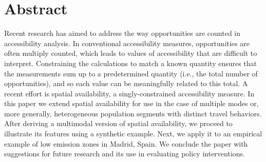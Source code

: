 \documentclass[10pt,letterpaper]{article}
\newcommand{\getIndex}[2]{
  \ForEach{,}{\IfEq{#1}{\thislevelitem}{\number\thislevelcount\ExitForEach}{}}{#2}
}
\newcommand{\getAff}[1]{
  \getIndex{#1}{McMaster,Madrid}
}
\begin{document}
\vspace*{0.2in}


\section*{Abstract}
Recent research has aimed to address the way opportunities are counted
in accessibility analysis. In conventional accessibility measures,
opportunities are often multiply counted, which leads to values of
accessibility that are difficult to interpret. Constraining the
calculations to match a known quantity ensures that the measurements sum
up to a predetermined quantity (i.e., the total number of
opportunities), and so each value can be meaningfully related to this
total. A recent effort is spatial availability, a singly-constrained
accessibility measure. In this paper we extend spatial availability for
use in the case of multiple modes or, more generally, heterogeneous
population segments with distinct travel behaviors. After deriving a
multimodal version of spatial availability, we proceed to illustrate its
features using a synthetic example. Next, we apply it to an empirical
example of low emission zones in Madrid, Spain. We conclude the paper
with suggestions for future research and its use in evaluating policy
interventions.
\end{document}

